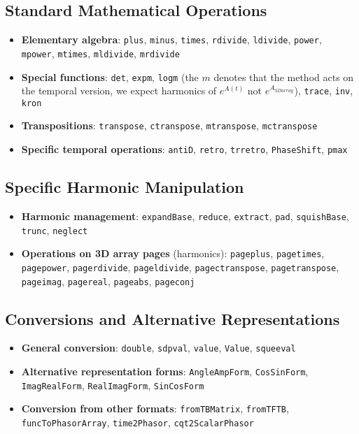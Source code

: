 \documentclass[11pt,a4paper]{article}
\begin{document}
\subsection{Standard Mathematical Operations}
\begin{itemize}
    \item \textbf{Elementary algebra}: \texttt{plus}, \texttt{minus}, \texttt{times}, \texttt{rdivide}, \texttt{ldivide}, \texttt{power}, \texttt{mpower}, \texttt{mtimes}, \texttt{mldivide}, \texttt{mrdivide}
    \item \textbf{Special functions}: \texttt{det}, \texttt{expm}, \texttt{logm} (the $m$ denotes that the method acts on the temporal version, we expect harmonics of $e^{A(t)}$ not $e^{A_{3Darray}}$), \texttt{trace}, \texttt{inv}, \texttt{kron}
    \item \textbf{Transpositions}: \texttt{transpose}, \texttt{ctranspose}, \texttt{mtranspose}, \texttt{mctranspose}
    \item \textbf{Specific temporal operations}: \texttt{antiD}, \texttt{retro}, \texttt{trretro}, \texttt{PhaseShift}, \texttt{pmax}
\end{itemize}

\subsection{Specific Harmonic Manipulation}
\begin{itemize}
    \item \textbf{Harmonic management}: \texttt{expandBase}, \texttt{reduce}, \texttt{extract}, \texttt{pad}, \texttt{squishBase}, \texttt{trunc}, \texttt{neglect}
    \item \textbf{Operations on 3D array pages} (harmonics): \texttt{pageplus}, \texttt{pagetimes}, \texttt{pagepower}, \texttt{pagerdivide}, \texttt{pageldivide}, \texttt{pagectranspose}, \texttt{pagetranspose}, \texttt{pageimag}, \texttt{pagereal}, \texttt{pageabs}, \texttt{pageconj}
\end{itemize}

\subsection{Conversions and Alternative Representations}
\begin{itemize}
    \item \textbf{General conversion}: \texttt{double}, \texttt{sdpval}, \texttt{value}, \texttt{Value}, \texttt{squeeval}
    \item \textbf{Alternative representation forms}: \texttt{AngleAmpForm}, \texttt{CosSinForm}, \texttt{ImagRealForm}, \texttt{RealImagForm}, \texttt{SinCosForm}
    \item \textbf{Conversion from other formats}: \texttt{fromTBMatrix}, \texttt{fromTFTB}, \texttt{funcToPhasorArray}, \texttt{time2Phasor}, \texttt{cqt2ScalarPhasor}
\end{itemize}
\end{document}

